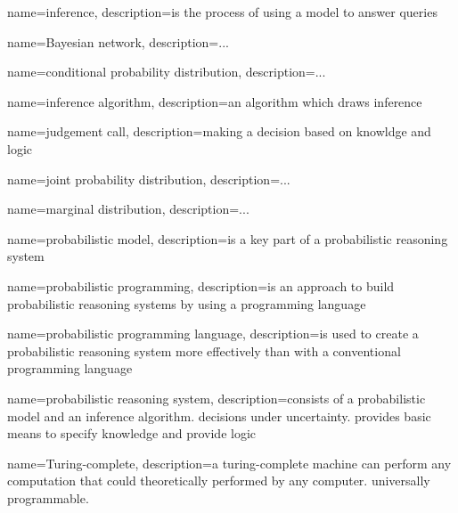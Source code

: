 {
  name=inference,
  description={is the process of using a model to answer queries \cite{9781617292330}}
}

{
  name=Bayesian network,
  description={...}
}

{
  name=conditional probability distribution,
  description={...}
}

{
  name=inference algorithm,
  description={an algorithm which draws \gls{inference}}
}

{
  name=judgement call,
  description={making a decision based on knowldge and logic \cite{9781617292330}}
}

{
  name=joint probability distribution,
  description={...}
}

{
  name=marginal distribution,
  description={...}
}

{
  name=probabilistic model,
  description={is a key part of a \gls{probabilistic reasoning system}}
}

{
  name=probabilistic programming,
  description={is an approach to build \gls{probabilistic reasoning system}s by using a programming language }
}

{
  name=probabilistic programming language,
  description={is used to create a \gls{probabilistic reasoning system} more effectively than with a conventional programming language}
}

{
  name=probabilistic reasoning system,
  description={consists of a \gls{probabilistic model} and an \gls{inference algorithm}. decisions under uncertainty. provides basic means to specify knowledge and provide logic \cite{9781617292330}}
}


{
  name=Turing-complete,
  description={a turing-complete machine can perform any computation that could theoretically performed by any computer. universally programmable.}
}